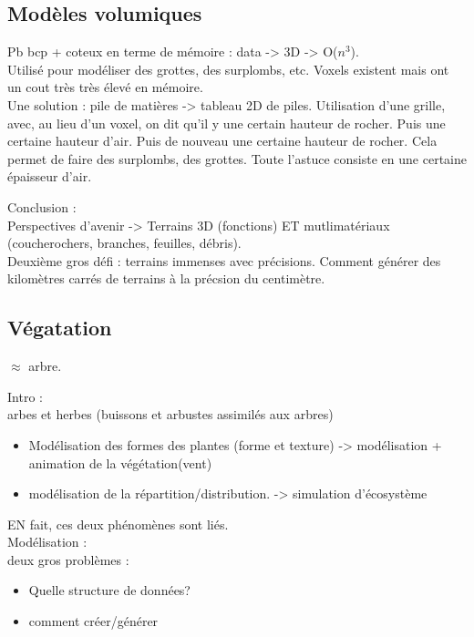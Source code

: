 \documentclass[11pt]{article}
\begin{document}
{\subsection{Modèles volumiques}
Pb bcp + coteux en terme de mémoire : data -> 3D -> O($n^3$).\\
Utilisé pour modéliser des grottes, des surplombs, etc. Voxels existent mais ont un cout très très élevé en mémoire.\\
Une solution : pile de matières -> tableau 2D de piles. Utilisation d'une grille, avec, au lieu d'un voxel, on dit qu'il y une certain hauteur de rocher. Puis une certaine hauteur d'air. Puis de nouveau une certaine hauteur de rocher. Cela permet de faire des surplombs, des grottes. Toute l'astuce consiste en une certaine épaisseur d'air.




Conclusion :\\
Perspectives d'avenir -> Terrains 3D (fonctions) ET mutlimatériaux (couche{rochers, branches, feuilles, débris}).\\
Deuxième gros défi : terrains immenses avec précisions. Comment générer des kilomètres carrés de terrains à la précsion du centimètre.


\vskip 2cm
\subsection{Végatation}
$\approx$ arbre.

Intro :\\
arbes et herbes (buissons et arbustes assimilés aux arbres)\\
\begin{itemize}
	\item Modélisation des formes des plantes (forme et texture) -> modélisation  + animation de la végétation(vent)\\
	\item modélisation de la répartition/distribution. -> simulation d'écosystème\\
\end{itemize}

EN fait, ces deux phénomènes sont liés.\\

Modélisation :\\
deux gros problèmes :
\begin{itemize}
	\item Quelle structure de données?
	\item comment créer/générer
\end{itemize}

}
\end{document}
